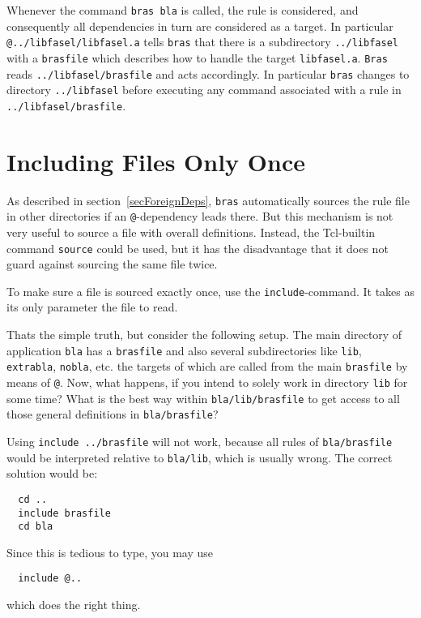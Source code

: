 \documentclass[12pt]{article}
\newcommand{\bras}{\texttt{bras}}
\newcommand{\Bras}{\texttt{Bras}}
\begin{document}
Whenever the command \texttt{bras bla} is called, the rule is
considered, and consequently all dependencies in turn are considered
as a target. In particular \texttt{@../libfasel/libfasel.a} tells
\bras{} that there is a subdirectory \texttt{../libfasel} with a
\texttt{brasfile} which describes how to handle the target
\texttt{libfasel.a}.  \Bras{} reads \texttt{../libfasel/bras\-file}
and acts accordingly.  In particular \bras{} changes to directory
\texttt{../libfasel} before executing any command associated with a
rule in \texttt{../libfasel/brasfile}.

\section{Including Files Only Once}
\label{secInclude}

As described in section~\ref{secForeignDeps}, \bras{} automatically
sources the rule file in other directories if an \texttt{@}-dependency
leads there. But this mechanism is not very useful to source a file
with overall definitions. Instead, the Tcl-builtin command
\texttt{source} could be used, but it has the disadvantage that it
does not guard against sourcing the same file twice.

To make sure a file is sourced exactly once, use the
\texttt{include}-command. It takes as its only parameter the file to
read. 

Thats the simple truth, but consider the following setup. The main
directory of application \texttt{bla} has a \texttt{brasfile} and also
several subdirectories like \texttt{lib}, \texttt{extrabla},
\texttt{nobla}, etc. the targets of which are called from the main
\texttt{brasfile} by means of \texttt{@}. Now, what happens,
if you intend to solely work in directory \texttt{lib} for some time?
What is the best way within \texttt{bla/lib/brasfile} to get access to all
those general definitions in \texttt{bla/brasfile}?

Using \texttt{include ../brasfile} will not work, because all
rules of \texttt{bla/brasfile} would be interpreted relative to
\texttt{bla/lib}, which is usually wrong. The correct solution would
be:
\begin{verbatim}
  cd ..
  include brasfile
  cd bla
\end{verbatim}
Since this is tedious to type, you may use
\begin{verbatim}
  include @..
\end{verbatim}
which does the right thing.
\end{document}
